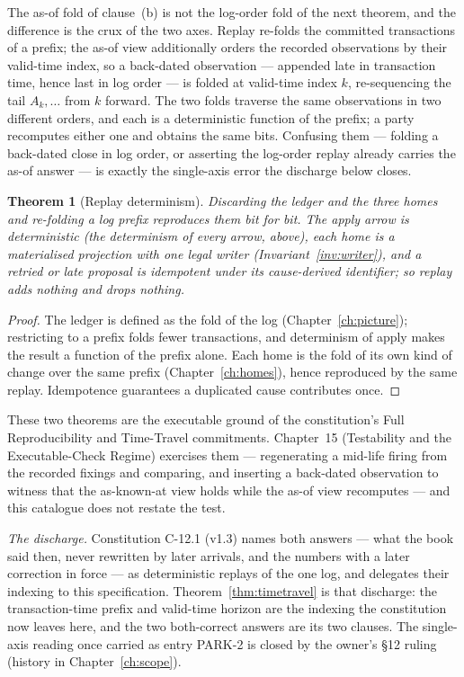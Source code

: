 \documentclass[11pt,a4paper]{article}
\newtheorem{theorem}[definition]{Theorem}
\begin{document}
The as-of fold of clause~(b) is not the log-order fold of the next theorem, and the
difference is the crux of the two axes. Replay re-folds the committed transactions of a
prefix; the as-of view additionally orders the recorded observations by their valid-time
index, so a back-dated observation --- appended late in transaction time, hence last in
log order --- is folded at valid-time index $k$, re-sequencing the tail $A_k,\dots$ from $k$
forward. The two folds traverse the same observations in two different orders, and each is
a deterministic function of the prefix; a party recomputes either one and obtains the same
bits. Confusing them --- folding a back-dated close in log order, or asserting the log-order
replay already carries the as-of answer --- is exactly the single-axis error the discharge
below closes.

\begin{theorem}[Replay determinism]\label{thm:replay}
Discarding the ledger and the three homes and re-folding a log prefix reproduces
them bit for bit. The apply arrow is deterministic (the determinism of every
arrow, above), each home is a materialised projection with one legal writer
(Invariant~\ref{inv:writer}), and a retried or late proposal is
idempotent under its cause-derived identifier; so replay adds nothing and drops
nothing.
\end{theorem}

\begin{proof}
The ledger is defined as the fold of the log (Chapter~\ref{ch:picture});
restricting to a prefix folds fewer transactions, and determinism of apply makes
the result a function of the prefix alone. Each home is the fold of its own kind
of change over the same prefix (Chapter~\ref{ch:homes}), hence reproduced by the
same replay. Idempotence guarantees a duplicated cause contributes once.
\end{proof}

These two theorems are the executable ground of the constitution's Full
Reproducibility and Time-Travel commitments. Chapter~15 (Testability and the
Executable-Check Regime) exercises them --- regenerating a mid-life firing from
the recorded fixings and comparing, and inserting a back-dated observation to
witness that the as-known-at view holds while the as-of view recomputes --- and
this catalogue does not restate the test.

\emph{The discharge.} Constitution C-12.1 (v1.3) names both answers --- what the book said
then, never rewritten by later arrivals, and the numbers with a later correction in force ---
as deterministic replays of the one log, and delegates their indexing to this specification.
Theorem~\ref{thm:timetravel} is that discharge: the transaction-time prefix and valid-time
horizon are the indexing the constitution now leaves here, and the two both-correct answers
are its two clauses. The single-axis reading once carried as entry PARK-2 is closed by the
owner's \S 12 ruling (history in Chapter~\ref{ch:scope}).
\end{document}
